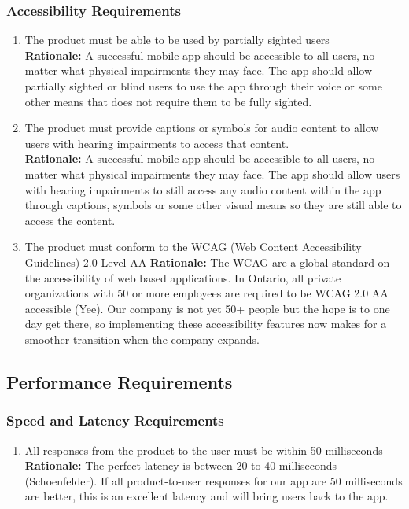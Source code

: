 \documentclass[]{article}
\begin{document}
\subsubsection{Accessibility Requirements}
\label{ssub:accessibility_requirements}
\begin{enumerate}[{UH-A}1. ]
	\item The product must be able to be used by partially sighted users \\
	{\bf Rationale:} A successful mobile app should be accessible to all users, no matter what physical impairments they may face. The app should allow partially sighted or blind users to use the app through their voice or some other means that does not require them to be fully sighted.
	\item The product must provide captions or symbols for audio content to allow users with hearing impairments to access that content. \\
	{\bf Rationale:} A successful mobile app should be accessible to all users, no matter what physical impairments they may face. The app should allow users with hearing impairments to still access any audio content within the app through captions, symbols or some other visual means so they are still able to access the content.
	\item The product must conform to the WCAG (Web Content Accessibility Guidelines) 2.0 Level AA 
	{\bf Rationale:} The WCAG are a global standard on the accessibility of web based applications. In Ontario, all private organizations with 50 or more employees are required to be WCAG 2.0 AA accessible (Yee). Our company is not yet 50+ people but the hope is to one day get there, so implementing these accessibility features now makes for a smoother transition when the company expands.
\end{enumerate}


\subsection{Performance Requirements}
\label{sub:performance_requirements}

\subsubsection{Speed and Latency Requirements}
\label{ssub:speed_and_latency_requirements}
\begin{enumerate}[{PR-SL}1. ]
	\item All responses from the product to the user must be within 50 milliseconds \\
	{\bf Rationale:} The perfect latency is between 20 to 40 milliseconds (Schoenfelder). If all product-to-user responses for our app are 50 milliseconds are better, this is an excellent latency and will bring users back to the app.
\end{enumerate}
\end{document}
